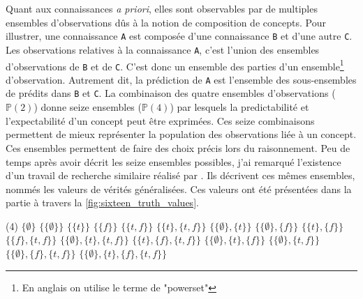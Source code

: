 \begin{refsegment}
Quant aux connaissances \textit{a priori}, elles sont observables par de multiples ensembles d'observations dûs à la notion de composition de concepts. Pour illustrer, une connaissance \texttt{A} est composée d'une connaissance \texttt{B} et d'une autre \texttt{C}. Les observations relatives à la connaissance \texttt{A}, c'est l'union des ensembles d'observations de \texttt{B} et de \texttt{C}. C'est donc un ensemble des parties d'un ensemble\footnote{En anglais on utilise le terme de "powerset"} d'observation. Autrement dit, la prédiction de \texttt{A} est l'ensemble des sous-ensembles de prédits dans \texttt{B} et \texttt{C}. La combinaison des quatre ensembles d'observations ($\mathbb{P}(2)$) donne seize ensembles ($\mathbb{P}(4)$) par lesquels la predictabilité et l'expectabilité d'un concept peut être exprimées. Ces seize combinaisons permettent de mieux représenter la population des observations liée à un concept. Ces ensembles permettent de faire des choix précis lors du raisonnement. Peu de temps après avoir décrit les seize ensembles possibles, j'ai remarqué l'existence d'un travail de recherche similaire réalisé par \citeauthor{shramko2005some}. Ils décrivent ces mêmes ensembles, nommés les valeurs de vérités généralisées. Ces valeurs ont été présentées dans la partie   à travers la \cref{fig:sixteen_truth_values}.

\begin{tasks}[counter-format = {tsk[1].},label-offset = {0.8em},label-format = {\bfseries}](4)
	\task $\{\emptyset\}$
	\task $\{\{\emptyset\}\}$
	\task $\{\{t\}\}$
	\task $\{\{f\}\}$
	\task $\{\{t,f\}\}$
	\task $\{\{t\},\{t,f\}\}$
	\task $\{\{\emptyset\},\{t\}\}$
	\task $\{\{\emptyset\},\{f\}\}$
	\task $\{\{t\},\{f\}\}$
	\task $\{\{f\},\{t,f\}\}$
	\task $\{\{\emptyset\},\{t\},\{t,f\}\}$
	\task $\{\{t\},\{f\},\{t,f\}\}$
	\task $\{\{\emptyset\},\{t\},\{f\}\}$
	\task $\{\{\emptyset\},\{t,f\}\}$
	\task $\{\{\emptyset\},\{f\},\{t,f\}\}$
	\task $\{\{\emptyset\},\{t\},\{f\},\{t,f\}\}$
\end{tasks}


\end{refsegment}
